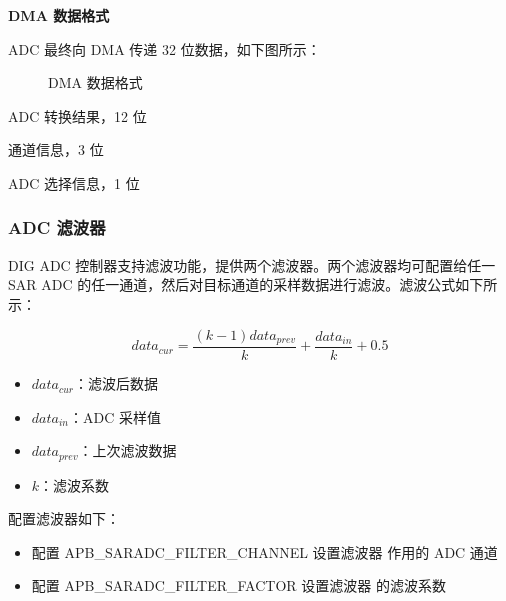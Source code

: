 \documentclass[main\_\_CN.tex]{subfiles}
\begin{document}
\textbf{DMA 数据格式}

ADC 最终向 DMA 传递 32 位数据，如下图所示：

\begin{figure}[H]
\centering
{}%
%
%
%
%
\end{figure}
\vspace{-2em}
\begin{figure}[H]
    \centering
    \caption{DMA 数据格式}
    \label{fig:sensor-dma-data-format}
\end{figure}
\vspace{-2em}
\begin{regdesc}\begin{reglist}
\item [data] ADC 转换结果，12 位
\item [ch\_sel] 通道信息，3 位
\item [sar\_sel] ADC 选择信息，1 位
\end{reglist}\end{regdesc}





\subsubsection{ADC 滤波器}
DIG ADC 控制器支持滤波功能，提供两个滤波器。两个滤波器均可配置给任一 SAR ADC 的任一通道，然后对目标通道的采样数据进行滤波。滤波公式如下所示：

\[data_{cur} = \frac{(k-1)data_{prev}}{k}+\frac{data_{in}}{k}+0.5\]

\begin{itemize}
    \item \(data_{cur}\)：滤波后数据
    \item \(data_{in}\)：ADC 采样值
    \item \(data_{prev}\)：上次滤波数据
    \item \(k\)：滤波系数
\end{itemize}

配置滤波器如下：
\begin{itemize}
\item 配置 APB\_SARADC\_FILTER\_CHANNEL 设置滤波器  作用的 ADC 通道
\item 配置 APB\_SARADC\_FILTER\_FACTOR 设置滤波器  的滤波系数
\end{itemize}
\end{document}
